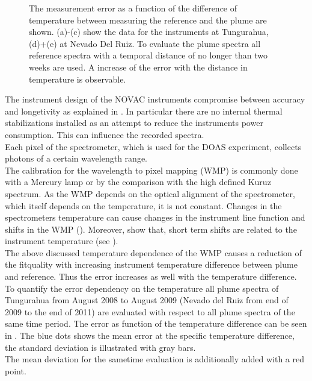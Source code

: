 \documentclass  [
  paper    = a4,
  BCOR     = 10mm,
  twoside,
  fontsize = 12pt,
  fleqn,
  toc      = bibnumbered,
  toc      = listofnumbered,
  numbers  = noendperiod,
  headings = normal,
  listof   = leveldown,
  version  = 3.03
]                                       {scrreprt}
\begin{document}
\begin{figure}
		\caption{The   measurement error as a function of the difference of temperature between measuring the reference and the plume are shown. (a)-(c) show the data for the instruments at Tungurahua, (d)+(e) at Nevado Del Ruiz. To evaluate the plume spectra all reference spectra with a temporal distance of no longer than two weeks are used. A increase of the  error with the distance in temperature is observable.}
		\label{fig:difftemp}
	\end{figure}
	The instrument design of the NOVAC instruments compromise between accuracy and longetivity as explained in . In particular there are no internal thermal stabilizations installed as an attempt to reduce the instruments power consumption. This can influence the recorded spectra.\\	
	Each pixel of the spectrometer, which is used for the DOAS experiment, collects photons of a certain wavelength range.\\
	The calibration for the wavelength to pixel mapping (WMP) is commonly done with a Mercury lamp or by the comparison with the high defined Kuruz spectrum.
	As the WMP depends on the optical alignment of the spectrometer, which itself depends on the temperature, it is not constant.
	Changes in the spectrometers temperature can cause changes in the instrument line function and shifts in the WMP (\citep{pinardi2007influence}). 
	Moreover, \cite{WarnachSimon} show that, short term shifts are related to the instrument temperature (see ).\\
	The above discussed temperature dependence of the WMP causes a reduction of the fitquality with increasing instrument temperature difference between plume and reference. Thus the  error increases as well with the temperature difference. To quantify the  error dependency on the temperature all plume spectra of Tungurahua from August 2008 to August 2009 (Nevado del Ruiz from end of 2009 to the end of 2011) are evaluated  with respect to all plume spectra of the same time period. 
	The  error as function of the temperature difference can be seen in . The blue dots shows the mean  error at the specific temperature difference, the standard deviation is illustrated with gray bars.\\
	The mean   deviation for the sametime evaluation is additionally added with a red point.
\end{document}
